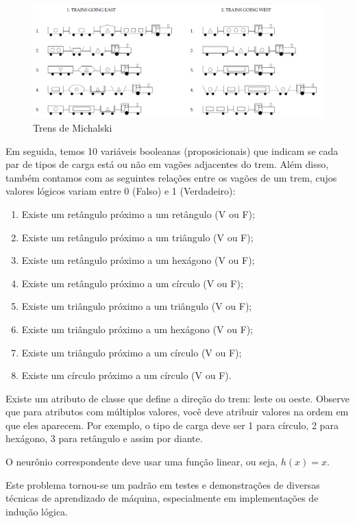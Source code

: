 \documentclass[12pt]{article}
\begin{document}
    \begin{figure}[H]
        \centering
        \includegraphics[width=0.9\linewidth]{michalskitrain.png}
        \caption{Trens de Michalski}
        \label{fig:trensmichalski}
    \end{figure}
    Em seguida, temos 10 variáveis booleanas (proposicionais) que indicam se cada par de tipos de carga está ou não em vagões adjacentes do trem. Além disso, também contamos com as seguintes relações entre os vagões de um trem, cujos valores lógicos variam entre 0 (Falso) e 1 (Verdadeiro):
    \begin{enumerate}
        \item Existe um retângulo próximo a um retângulo (V ou F);
        \item Existe um retângulo próximo a um triângulo (V ou F);
        \item Existe um retângulo próximo a um hexágono (V ou F);
        \item Existe um retângulo próximo a um círculo (V ou F);
        \item Existe um triângulo próximo a um triângulo (V ou F);
        \item Existe um triângulo próximo a um hexágono (V ou F);
        \item Existe um triângulo próximo a um círculo (V ou F);
        \item Existe um círculo próximo a um círculo (V ou F).
    \end{enumerate}

Existe um atributo de classe que define a direção do trem: leste ou oeste. Observe que para atributos com múltiplos valores, você deve atribuir valores na ordem em que eles aparecem. Por exemplo, o tipo de carga deve ser 1 para círculo, 2 para hexágono, 3 para retângulo e assim por diante.

O neurônio correspondente deve usar uma função linear, ou seja, $h(x) = x$.

Este problema tornou-se um padrão em testes e demonstrações de diversas técnicas de aprendizado de máquina, especialmente em implementações de indução lógica.
\end{document}
